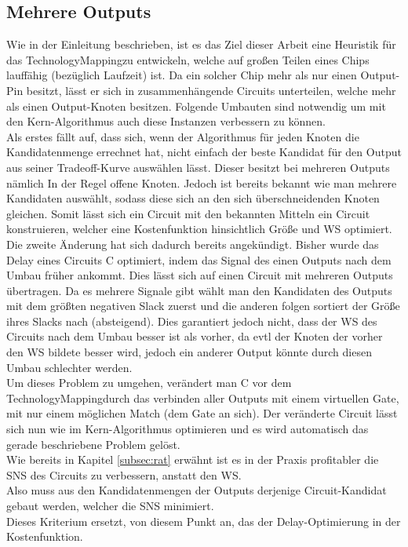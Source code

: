 \documentclass[11pt, a4paper, german]{article}
\newcommand{\TM}{TechnologyMapping}
\begin{document}
\subsection{Mehrere Outputs}
\label{subsec:mehrere_outputs}
Wie in der Einleitung beschrieben, ist es das Ziel dieser Arbeit eine Heuristik für das \TM zu entwickeln, welche auf großen Teilen eines Chips lauffähig (bezüglich Laufzeit) ist. Da ein solcher Chip mehr als nur einen Output-Pin besitzt, lässt er sich in zusammenhängende Circuits unterteilen, welche mehr als einen Output-Knoten besitzen. Folgende Umbauten sind notwendig um mit den Kern-Algorithmus auch diese Instanzen verbessern zu können.\\

Als erstes fällt auf, dass sich, wenn der Algorithmus für jeden Knoten die Kandidatenmenge errechnet hat, nicht einfach der beste Kandidat für den Output aus seiner Tradeoff-Kurve auswählen lässt. Dieser besitzt bei mehreren Outputs nämlich In der Regel offene Knoten. 
Jedoch ist bereits bekannt wie man mehrere Kandidaten auswählt, sodass diese sich an den sich überschneidenden Knoten gleichen. Somit lässt sich ein Circuit mit den bekannten Mitteln ein Circuit konstruieren, welcher eine Kostenfunktion hinsichtlich Größe und WS optimiert. \\

Die zweite Änderung hat sich dadurch bereits angekündigt. Bisher wurde das Delay eines Circuits C optimiert, indem das Signal des einen Outputs nach dem Umbau früher ankommt. Dies lässt sich auf einen Circuit mit mehreren Outputs übertragen. Da es mehrere Signale gibt wählt man den Kandidaten des Outputs mit dem größten negativen Slack zuerst und die anderen folgen sortiert der Größe ihres Slacks nach (absteigend). Dies garantiert jedoch nicht, dass der WS des Circuits nach dem Umbau besser ist als vorher, da evtl der Knoten der vorher den WS bildete besser wird, jedoch ein anderer Output könnte durch diesen Umbau schlechter werden. \\
Um dieses Problem zu umgehen, verändert man C vor dem \TM durch das verbinden aller Outputs mit einem virtuellen Gate, mit nur einem möglichen Match (dem Gate an sich). Der veränderte Circuit lässt sich nun wie im Kern-Algorithmus optimieren und es wird automatisch das gerade beschriebene Problem gelöst.\\ 
Wie bereits in Kapitel \ref{subsec:rat}  erwähnt ist es in der Praxis profitabler die SNS des Circuits zu verbessern, anstatt den WS.\\
Also muss aus den Kandidatenmengen der Outputs derjenige Circuit-Kandidat gebaut werden, welcher die SNS minimiert.\\
 Dieses Kriterium ersetzt, von diesem Punkt an,  das der Delay-Optimierung in der Kostenfunktion.\\
 
\end{document}
